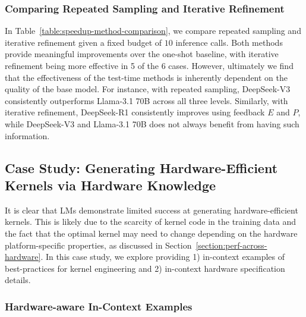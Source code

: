 \FloatBarrier  

\subsubsection{Comparing Repeated Sampling and Iterative Refinement}


In Table~\ref{table:speedup-method-comparison}, we compare repeated sampling and iterative refinement given a fixed budget of $10$ inference calls. Both methods provide meaningful improvements over the one-shot baseline, with iterative refinement being more effective in 5 of the 6 cases. However, ultimately we find that the effectiveness of the test-time methods is inherently dependent on the quality of the base model. For instance, with repeated sampling, DeepSeek-V3 consistently outperforms Llama-3.1 70B across all three levels. Similarly, with iterative refinement, DeepSeek-R1 consistently improves using feedback $E$ and $P$, while DeepSeek-V3 and Llama-3.1 70B does not always benefit from having such information. 

\vspace{-2mm}
\subsection{Case Study: Generating Hardware-Efficient Kernels via Hardware Knowledge}
\label{subsection:hardware-info-case-study}

It is clear that LMs demonstrate limited success at generating hardware-efficient kernels. This is likely due to the scarcity of kernel code in the training data and the fact that the optimal kernel may need to change depending on the hardware platform-specific properties, as discussed in Section~\ref{section:perf-across-hardware}. In this case study, we explore providing 1) in-context examples of best-practices for kernel engineering and 2) in-context hardware specification details.


\subsubsection{Hardware-aware In-Context Examples}
\label{subsection:few-shot}

